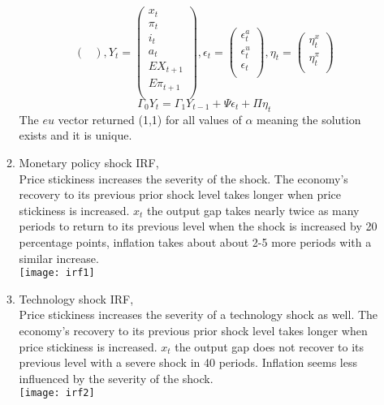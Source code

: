 \documentclass[]{article}
\begin{document}
\begin{enumerate}
\begin{enumerate}
\[\begin{pmatrix}
	\end{pmatrix}, Y_t = \begin{pmatrix}
	x_t \\
	\pi_t \\
	i_t \\
	a_t \\
	E X_{t+1} \\
	E\pi_{t+1} \\
	\end{pmatrix}, \epsilon_t = \begin{pmatrix}
	\epsilon_t^a \\
	\epsilon_t^u \\
	\epsilon_t \\
	\end{pmatrix}, \eta_t = \begin{pmatrix}
	\eta_t^x \\
	\eta_t^\pi \\
	\end{pmatrix}
	\]
	\[  \Gamma_0 Y_t = \Gamma_1 Y_{t-1} + \Psi \epsilon_t + \Pi\eta_t \]
The $ eu $	vector returned (1,1) for all values of $ \alpha $ meaning the solution exists and it is unique. 
\item Monetary policy shock IRF, \\
Price stickiness increases the severity of the shock. The economy's recovery to its previous prior shock level takes longer when price stickiness is increased. $ x_t $ the output gap takes nearly twice as many periods to return to its previous level when the shock is increased by 20 percentage points, inflation takes about about 2-5 more periods with a similar increase. \\
\texttt{[image: irf1]} \\

\item  Technology shock IRF, \\
Price stickiness increases the severity of a technology shock as well. The economy's recovery to its previous prior shock level takes longer when price stickiness is increased. $ x_t $ the output gap does not recover to its previous level with a severe shock in 40 periods. Inflation seems less influenced by the severity of the shock. \\
\texttt{[image: irf2]}


\end{enumerate}
\end{enumerate}
\end{document}
